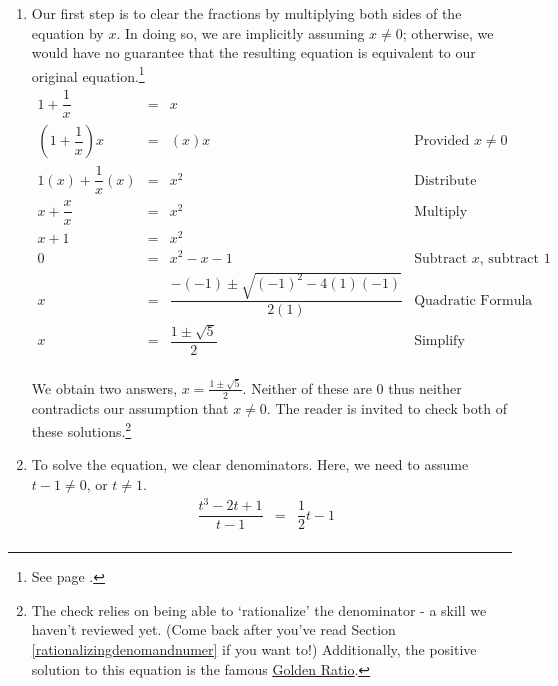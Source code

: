 \documentclass{ximera}
\begin{document}
\begin{example}
\begin{enumerate}
\item   Our first step is to clear the fractions by multiplying both sides of the equation by $x$. In doing so, we are implicitly assuming $x \neq 0$; otherwise, we would have no guarantee that the resulting equation is equivalent to our original equation.\footnote{See page \pageref{equivalenteqnineq}.}\[ \begin{array}{rclr}

1 + \dfrac{1}{x} & = & x & \\ [8pt]

\left(1 + \dfrac{1}{x}\right) x & = & (x)x & \text{Provided $x \neq 0$} \\ [10pt]


1(x) + \dfrac{1}{x} (x) & = & x^2 & \text{Distribute} \\ [8pt]

x + \dfrac{x}{x} & = & x^2 & \text{Multiply} \\ [8pt]

x + 1 & = & x^2 &  \\

0 & = & x^2 - x - 1 & \text{Subtract $x$, subtract $1$} \\ [5pt]

x & = & \dfrac{-(-1) \pm \sqrt{(-1)^2 - 4(1)(-1)}}{2(1)} & \text{Quadratic Formula} \\

x & = & \dfrac{1 \pm \sqrt{5}}{2} & \text{Simplify} \\

\end{array}\]

We obtain two answers, $x = \frac{1 \pm \sqrt{5}}{2}$.  Neither of these are $0$ thus neither contradicts our assumption that $x \neq 0$.  The reader is invited to check both of these solutions.\footnote{The check relies on being able to `rationalize' the denominator  - a skill we haven't reviewed yet. (Come back after you've read Section \ref{rationalizingdenomandnumer} if you want to!)  Additionally, the positive solution to this equation is the famous \href{http://en.wikipedia.org/wiki/Golden_ratio}{\underline{Golden Ratio}}.}

\item  To solve the equation, we clear denominators.  Here, we need to assume $t-1 \neq 0$, or $t \neq 1$.\[ \begin{array}{rclr}

\dfrac{t^3-2t+1}{t-1} & = & \dfrac{1}{2}t-1 & \\ [8pt]


\end{array}\]
\end{enumerate}
\end{example}
\end{document}
